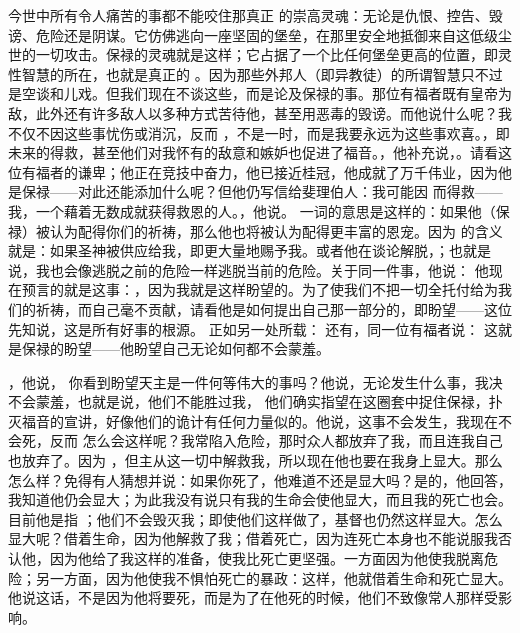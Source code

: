 今世中所有令人痛苦的事都不能咬住那真正  的崇高灵魂：无论是仇恨、控告、毁谤、危险还是阴谋。它仿佛逃向一座坚固的堡垒，在那里安全地抵御来自这低级尘世的一切攻击。保禄的灵魂就是这样；它占据了一个比任何堡垒更高的位置，即灵性智慧的所在，也就是真正的 。因为那些外邦人（即异教徒）的所谓智慧只不过是空谈和儿戏。但我们现在不谈这些，而是论及保禄的事。那位有福者既有皇帝为敌，此外还有许多敌人以多种方式苦待他，甚至用恶毒的毁谤。而他说什么呢？我不仅不因这些事忧伤或消沉，反而 ，不是一时，而是我要永远为这些事欢喜。，即未来的得救，甚至他们对我怀有的敌意和嫉妒也促进了福音。，他补充说，。请看这位有福者的谦卑；他正在竞技中奋力，他已接近桂冠，他成就了万千伟业，因为他是保禄——对此还能添加什么呢？但他仍写信给斐理伯人：我可能因  而得救——我，一个藉着无数成就获得救恩的人。，他说。 一词的意思是这样的：如果他（保禄）被认为配得你们的祈祷，那么他也将被认为配得更丰富的恩宠。因为  的含义就是：如果圣神被供应给我，即更大量地赐予我。或者他在谈论解脱，；也就是说，我也会像逃脱之前的危险一样逃脱当前的危险。关于同一件事，他说：  他现在预言的就是这事：，因为我就是这样盼望的。为了使我们不把一切全托付给为我们的祈祷，而自己毫不贡献，请看他是如何提出自己那一部分的，即盼望——这位先知说，这是所有好事的根源。  正如另一处所载：  还有，同一位有福者说：  这就是保禄的盼望——他盼望自己无论如何都不会蒙羞。\par

，他说， 你看到盼望天主是一件何等伟大的事吗？他说，无论发生什么事，我决不会蒙羞，也就是说，他们不能胜过我， 他们确实指望在这圈套中捉住保禄，扑灭福音的宣讲，好像他们的诡计有任何力量似的。他说，这事不会发生，我现在不会死，反而  怎么会这样呢？我常陷入危险，那时众人都放弃了我，而且连我自己也放弃了。因为  ，但主从这一切中解救我，所以现在他也要在我身上显大。那么怎么样？免得有人猜想并说：如果你死了，他难道不还是显大吗？是的，他回答，我知道他仍会显大；为此我没有说只有我的生命会使他显大，而且我的死亡也会。目前他是指 ；他们不会毁灭我；即使他们这样做了，基督也仍然这样显大。怎么显大呢？借着生命，因为他解救了我；借着死亡，因为连死亡本身也不能说服我否认他，因为他给了我这样的准备，使我比死亡更坚强。一方面因为他使我脱离危险；另一方面，因为他使我不惧怕死亡的暴政：这样，他就借着生命和死亡显大。他说这话，不是因为他将要死，而是为了在他死的时候，他们不致像常人那样受影响。\par

